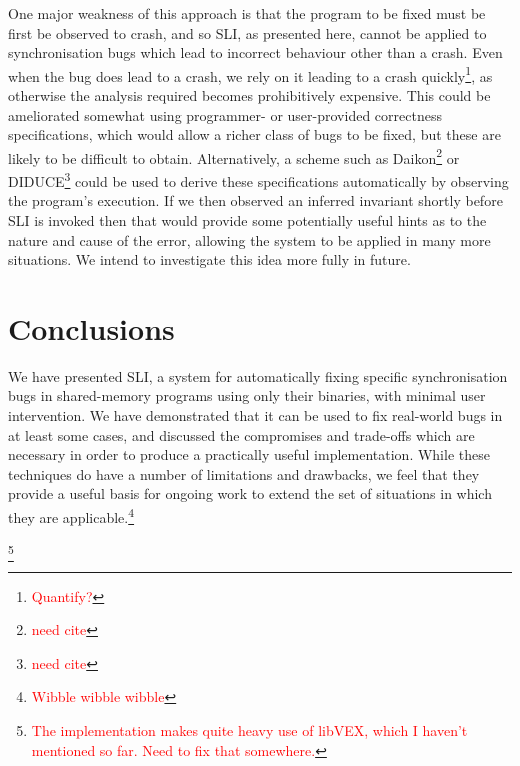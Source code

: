 \documentclass[10pt,twocolumn,preprint,natbib,authoryear]{sigplanconf}
\newcommand{\editorial}[1]{\textcolor{red}{\footnote{\textcolor{red}{#1}}}}
\newcommand{\needCite}{\editorial{need cite}}
\begin{document}
One major weakness of this approach is that the program to be fixed
must be first be observed to crash, and so SLI, as presented here,
cannot be applied to synchronisation bugs which lead to incorrect
behaviour other than a crash.  Even when the bug does lead to a crash,
we rely on it leading to a crash quickly\editorial{Quantify?}, as
otherwise the analysis required becomes prohibitively expensive.  This
could be ameliorated somewhat using programmer- or user-provided
correctness specifications, which would allow a richer class of bugs
to be fixed, but these are likely to be difficult to obtain.
Alternatively, a scheme such as Daikon\needCite{} or DIDUCE\needCite{}
could be used to derive these specifications automatically by
observing the program's execution.  If we then observed an inferred
invariant shortly before SLI is invoked then that would provide some
potentially useful hints as to the nature and cause of the error,
allowing the system to be applied in many more situations.  We intend
to investigate this idea more fully in future.

\section{Conclusions}

We have presented SLI, a system for automatically fixing specific
synchronisation bugs in shared-memory programs using only their
binaries, with minimal user intervention.  We have demonstrated that
it can be used to fix real-world bugs in at least some cases, and
discussed the compromises and trade-offs which are necessary in order
to produce a practically useful implementation.  While these
techniques do have a number of limitations and drawbacks, we feel that
they provide a useful basis for ongoing work to extend the set of
situations in which they are applicable.\editorial{Wibble wibble
  wibble}

\acks

\editorial{The implementation makes quite heavy use of libVEX, which I
  haven't mentioned so far.  Need to fix that somewhere.}



    
\end{document}
